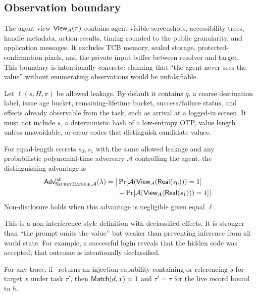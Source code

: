 \subsection{Observation boundary}

The agent view $\mathsf{View}_A(\pi)$ contains agent-visible screenshots, accessibility trees, handle metadata, action results, timing rounded to the public granularity, and application messages. It excludes TCB memory, sealed storage, protected-confirmation pixels, and the private input buffer between resolver and target. This boundary is intentionally concrete: claiming that ``the agent never sees the value'' without enumerating observations would be unfalsifiable.

Let $\ell(s,H,\pi)$ be allowed leakage. By default it contains $q$, a coarse destination label, issue age bucket, remaining-lifetime bucket, success/failure status, and effects already observable from the task, such as arrival at a logged-in screen. It must not include $s$, a deterministic hash of a low-entropy OTP, value length unless unavoidable, or error codes that distinguish candidate values.

\begin{definition}
For equal-length secrets $s_0,s_1$ with the same allowed leakage and any probabilistic polynomial-time adversary $\mathcal{A}$ controlling the agent, the distinguishing advantage is
\begin{equation}
\begin{aligned}
\mathsf{Adv}^{\mathsf{nd}}_{\textsc{SecretHandle},\mathcal{A}}(\lambda)=
\big|&\Pr[\mathcal{A}(\mathsf{View}_A(\mathsf{Real}(s_0)))=1]\\
&-\Pr[\mathcal{A}(\mathsf{View}_A(\mathsf{Real}(s_1)))=1]\big|.
\end{aligned}
\label{eq:nd}
\end{equation}
Non-disclosure holds when this advantage is negligible given equal $\ell$.
\end{definition}

This is a non-interference-style definition with declassified effects. It is stronger than ``the prompt omits the value'' but weaker than preventing inference from all world state. For example, a successful login reveals that the hidden code was accepted; that outcome is intentionally declassified.

\begin{definition}
For any trace, if \Resolve\ returns an injection capability containing or referencing $s$ for target $x$ under task $\tau'$, then $\mathsf{Match}(d,x)=1$ and $\tau'=\tau$ for the live record bound to $h$.
\end{definition}

